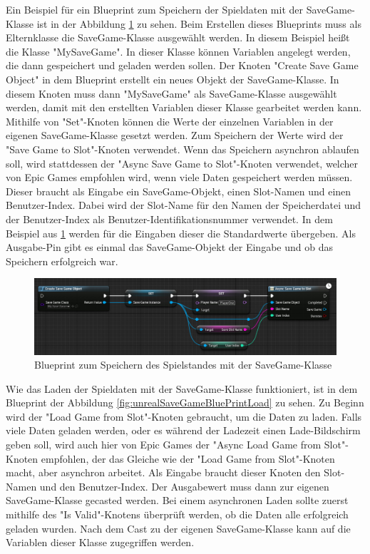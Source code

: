 Ein Beispiel für ein Blueprint zum Speichern der Spieldaten mit der SaveGame-Klasse ist in der Abbildung \ref{fig:unrealSaveGameBluePrintSave} zu sehen. Beim Erstellen dieses Blueprints muss als Elternklasse die SaveGame-Klasse ausgewählt werden. In diesem Beispiel heißt die Klasse "MySaveGame". In dieser Klasse können Variablen angelegt werden, die dann gespeichert und geladen werden sollen. Der Knoten "Create Save Game Object" in dem Blueprint erstellt ein neues Objekt der SaveGame-Klasse. In diesem Knoten muss dann "MySaveGame" als SaveGame-Klasse ausgewählt werden, damit mit den erstellten Variablen dieser Klasse gearbeitet werden kann. Mithilfe von "Set"-Knoten können die Werte der einzelnen Variablen in der eigenen SaveGame-Klasse gesetzt werden. Zum Speichern der Werte wird der "Save Game to Slot"-Knoten verwendet. Wenn das Speichern asynchron ablaufen soll, wird stattdessen der "Async Save Game to Slot"-Knoten verwendet, welcher von Epic Games empfohlen wird, wenn viele Daten gespeichert werden müssen. Dieser braucht als Eingabe ein SaveGame-Objekt, einen Slot-Namen und einen Benutzer-Index. Dabei wird der Slot-Name für den Namen der Speicherdatei und der Benutzer-Index als Benutzer-Identifikationsnummer verwendet. In dem Beispiel aus \ref{fig:unrealSaveGameBluePrintSave} werden für die Eingaben dieser die Standardwerte übergeben. Als Ausgabe-Pin gibt es einmal das SaveGame-Objekt der Eingabe und ob das Speichern erfolgreich war.\cite{unrealengineSavingLoading}

\begin{figure}[htp]
    \centering
    \includegraphics[width=1\textwidth]{images/SaveGameBP.png}
    \caption{Blueprint zum Speichern des Spielstandes mit der SaveGame-Klasse \cite{unrealengineSavingLoading}}
    \label{fig:unrealSaveGameBluePrintSave}
\end{figure}

Wie das Laden der Spieldaten mit der SaveGame-Klasse funktioniert, ist in dem Blueprint der Abbildung \ref{fig:unrealSaveGameBluePrintLoad} zu sehen. Zu Beginn wird der "Load Game from Slot"-Knoten gebraucht, um die Daten zu laden. Falls viele Daten geladen werden, oder es während der Ladezeit einen Lade-Bildschirm geben soll, wird auch hier von Epic Games der "Async Load Game from Slot"-Knoten empfohlen, der das Gleiche wie der "Load Game from Slot"-Knoten macht, aber asynchron arbeitet. Als Eingabe braucht dieser Knoten den Slot-Namen und den Benutzer-Index. Der Ausgabewert muss dann zur eigenen SaveGame-Klasse gecasted werden. Bei einem asynchronen Laden sollte zuerst mithilfe des "Is Valid"-Knotens überprüft werden, ob die Daten alle erfolgreich geladen wurden. Nach dem Cast zu der eigenen SaveGame-Klasse kann auf die Variablen dieser Klasse zugegriffen werden.\cite{unrealengineSavingLoading}

